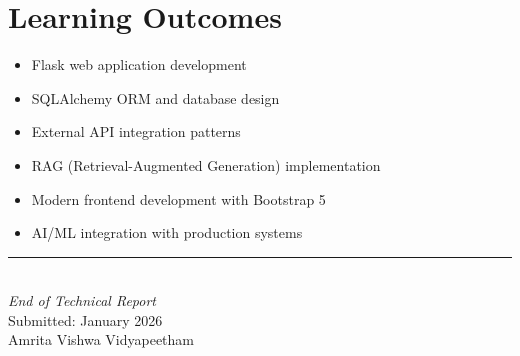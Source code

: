 \documentclass[12pt,a4paper]{report}
\begin{document}
\section{Learning Outcomes}
\begin{itemize}
    \item Flask web application development
    \item SQLAlchemy ORM and database design
    \item External API integration patterns
    \item RAG (Retrieval-Augmented Generation) implementation
    \item Modern frontend development with Bootstrap 5
    \item AI/ML integration with production systems
\end{itemize}

\vspace{1cm}
\begin{center}
\textcolor{primarycolor}{\rule{0.5\textwidth}{2pt}}\\[0.5cm]
\large\textit{End of Technical Report}\\[0.3cm]
\normalsize Submitted: January 2026\\
Amrita Vishwa Vidyapeetham
\end{center}
\end{document}
